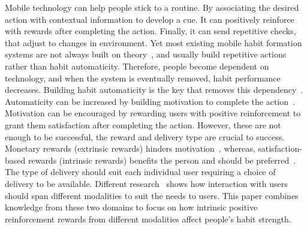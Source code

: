 \documentclass{scaffold/sigchi}
\begin{document}
Mobile technology can help people stick to a routine. By associating the desired action with contextual information to develop a cue. It can positively reinforce with rewards after completing the action. Finally, it can send repetitive checks, that adjust to changes in environment.
Yet most existing mobile habit formation systems are not always built on theory~\cite{article_beyond_self_tracking_designing_apps, article_dont_kick_habit}, and usually build repetitive actions rather than habit automaticity.
Therefore, people become dependent on technology, and when the system is eventually removed, habit performance decreases. Building habit automaticity is the key that removes this dependency~\cite{article_beyond_self_tracking_designing_apps}.\newline
\newline
Automaticity can be increased by building motivation to complete the action~\cite{article_a_self_efficacy, article_meta_analytic_review_intrinsic_motivation}.
Motivation can be encouraged by rewarding users with positive reinforcement to grant them satisfaction after completing the action.
However, these are not enough to be successful, the reward and delivery type are crucial to success.\newline
\newline
Monetary rewards (extrinsic rewards) hinders motivation~\cite{article_meta_analytic_review_intrinsic_motivation}, whereas, satisfaction-based rewards (intrinsic rewards) benefits the person and should be preferred~\cite{article_meta_analytic_review_intrinsic_motivation}.
The type of delivery should suit each individual user requiring a choice of delivery to be available.
Different research~\cite{article_user_centred_multimodal_reminders} shows how interaction with users should span different modalities to suit the needs to users.
This paper combines knowledge from these two domains to focus on how intrinsic positive reinforcement rewards from different modalities affect people's habit strength.
\end{document}
